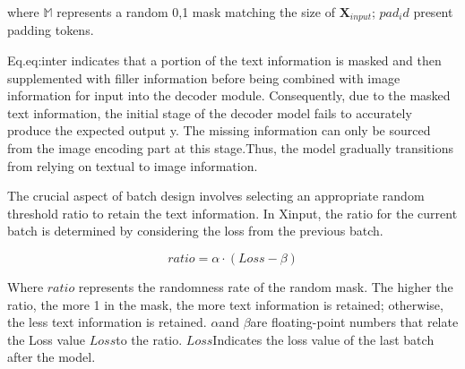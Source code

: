 \documentclass[runningheads]{llncs}
\begin{document}
where $\mathbb{M}$ represents a random 0,1 mask matching the size of $\textbf{X}_{input}$; $pad_id$ present padding tokens.

Eq.{eq:inter} indicates that a portion of the text information is masked and then supplemented with filler information before being combined with image information for input into the decoder module.	Consequently, due to the masked text information, the initial stage of the decoder model fails to accurately produce the expected output y.	The missing information can only be sourced from the image encoding part at this stage.Thus, the model gradually transitions from relying on textual to image information.

The crucial aspect of batch design involves selecting an appropriate random threshold ratio to retain the text information.	In Xinput, the ratio for the current batch is determined by considering the loss from the previous batch.	

\begin{equation}\label{eq:ratio}
    ratio = \alpha \cdot (Loss - \beta)
\end{equation}

Where $ratio$ represents the randomness rate of the random mask. The higher the ratio, the more 1 in the mask, the more text information is retained; otherwise, the less text information is retained. $\alpha$and $\beta$are floating-point numbers that relate the Loss value $Loss$to the ratio. $Loss$Indicates the loss value of the last batch after the model.
\end{document}
